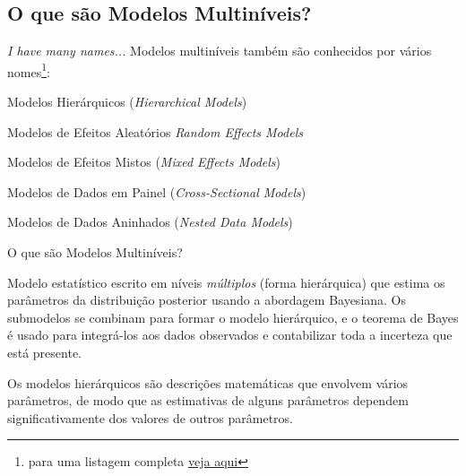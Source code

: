\subsection{O que são Modelos Multiníveis?}
\begin{frame}{\textit{I have many names...}}
    Modelos multiníveis também são conhecidos por vários nomes\footnote{para uma listagem completa \href{https://statmodeling.stat.columbia.edu/2019/09/18/all-the-names-for-hierarchical-and-multilevel-modeling/}{veja aqui}}:
    \begin{vfilleditems}
        \item Modelos Hierárquicos (\textit{Hierarchical Models})
        \item Modelos de Efeitos Aleatórios \textit{Random Effects Models}
        \item Modelos de Efeitos Mistos (\textit{Mixed Effects Models})
        \item Modelos de Dados em Painel (\textit{Cross-Sectional Models})
        \item Modelos de Dados Aninhados (\textit{Nested Data Models})
    \end{vfilleditems}
\end{frame}

\begin{frame}{O que são Modelos Multiníveis?}
    \begin{defn}
        Modelo estatístico escrito em níveis \textit{múltiplos} (forma hierárquica)
        que estima os parâmetros da distribuição posterior usando a abordagem
        Bayesiana. Os submodelos se combinam para formar o modelo hierárquico, e o
        teorema de Bayes é usado para integrá-los aos dados observados e contabilizar
        toda a incerteza que está presente.
    \end{defn}
    \vfill
    Os modelos hierárquicos são descrições matemáticas que envolvem vários parâmetros,
    de modo que as estimativas de alguns parâmetros dependem significativamente
    dos valores de outros parâmetros.
\end{frame}

